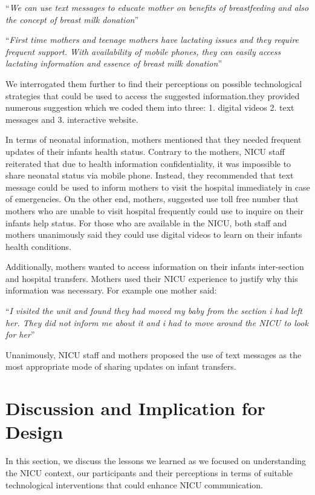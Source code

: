 \enquote{\itshape We can use text messages to educate mother on benefits of breastfeeding and also the concept of breast milk donation}\bigbreak

\enquote{\itshape First time mothers and teenage mothers have lactating issues and they require frequent support. With availability of mobile phones, they can easily access lactating information and essence of breast milk donation}\bigbreak

We interrogated them further to find their perceptions on possible technological strategies that could be used to access the suggested information.they provided numerous suggestion which we coded them into three: 1. digital videos 2. text messages and 3. interactive website.

In terms of neonatal information, mothers mentioned that they needed frequent updates of their infants health status. Contrary to the mothers, NICU staff reiterated that due to health information confidentiality, it was impossible to share neonatal status via mobile phone. Instead, they recommended that text message could be used to inform mothers to visit the hospital immediately in case of emergencies. On the other end, mothers, suggested use toll free number that  mothers who are unable to visit hospital frequently could use to inquire on their infants help status. For those who are available in the NICU, both staff and mothers unanimously said they could use digital videos to learn on their infants health conditions.

Additionally, mothers wanted to access information on their infants inter-section and hospital transfers. Mothers used their NICU experience to justify why this information was necessary. For example one mother said:

\enquote{\itshape  I visited the unit and found they had moved my baby from the section i had left her. They did not inform me about it and i had to move around the NICU to look for her} \bigbreak

Unanimously, NICU staff and mothers proposed the use of text messages as the most appropriate mode of sharing updates on infant transfers.

\section{Discussion and Implication for Design}
In this section, we discuss the lessons we learned as we focused on understanding the NICU context, our participants and their perceptions in terms of suitable technological interventions that could enhance NICU communication.

